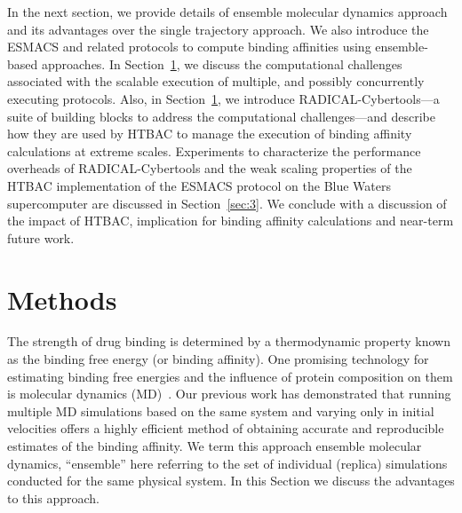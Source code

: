 \documentclass{bmcart}
\begin{document}


In the next section, we provide details of ensemble molecular dynamics
approach and its advantages over the single trajectory approach. We also
introduce the ESMACS and related protocols to compute binding affinities
using ensemble-based approaches. In Section~\ref{sec:2}, we discuss the
computational challenges associated with the scalable execution of multiple,
and possibly concurrently executing protocols. Also, in Section~\ref{sec:2}, 
we introduce RADICAL-Cybertools---a suite of building blocks to address the 
computational challenges---and describe how they are used by HTBAC to
manage the execution of binding affinity calculations at extreme scales.
Experiments to characterize the performance overheads of RADICAL-Cybertools
and the weak scaling properties of the HTBAC implementation of the ESMACS
protocol on the Blue Waters supercomputer are discussed in
Section~\ref{sec:3}. 
We conclude with a discussion of the impact of HTBAC, implication for binding
affinity calculations and near-term future work.


\section{Methods}\label{sec:2}
The strength of drug binding is determined by a thermodynamic property known
as the binding free energy (or binding affinity). One promising technology for
estimating binding free energies and the influence of protein composition on
them is molecular dynamics (MD)~\cite{Karplus2005}. Our previous work
\cite{Sadiq2010, Wan2011} has demonstrated that running multiple MD
simulations based on the same system and varying only in initial velocities
offers a highly efficient method of obtaining accurate and reproducible
estimates of the binding affinity. We term this approach ensemble molecular
dynamics, ``ensemble'' here referring to the set of individual (replica)
simulations conducted for the same physical system. In this Section we discuss
the advantages to this approach.
\end{document}
